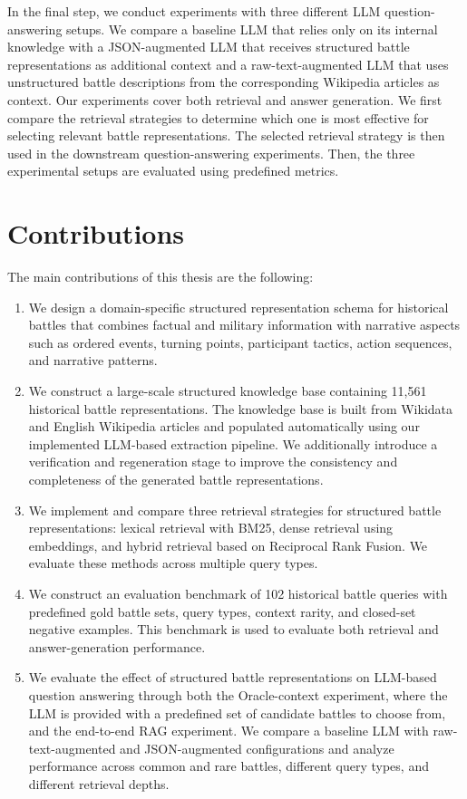 In the final step, we conduct experiments with three different LLM question-answering setups. We compare a baseline LLM that relies only on its internal knowledge with a JSON-augmented LLM that receives structured battle representations as additional context and a raw-text-augmented LLM that uses unstructured battle descriptions from the corresponding Wikipedia articles as context. Our experiments cover both retrieval and answer generation. We first compare the retrieval strategies to determine which one is most effective for selecting relevant battle representations. The selected retrieval strategy is then used in the downstream question-answering experiments. Then, the three experimental setups are evaluated using predefined metrics.
\section{Contributions}
\label{sec:contributions}
The main contributions of this thesis are the following:

\begin{enumerate}
    \item We design a domain-specific structured representation schema for historical battles that combines factual and military information with narrative aspects such as ordered events, turning points, participant tactics, action sequences, and narrative patterns.

    \item We construct a large-scale structured knowledge base containing 11,561 historical battle representations. The knowledge base is built from Wikidata and English Wikipedia articles and populated automatically using our implemented LLM-based extraction pipeline. We additionally introduce a verification and regeneration stage to improve the consistency and completeness of the generated battle representations.

    \item We implement and compare three retrieval strategies for structured battle representations: lexical retrieval with BM25, dense retrieval using embeddings, and hybrid retrieval based on Reciprocal Rank Fusion. We evaluate these methods across multiple query types.

    \item We construct an evaluation benchmark of 102 historical battle queries with predefined gold battle sets, query types, context rarity, and closed-set negative examples. This benchmark is used to evaluate both retrieval and answer-generation performance.

    \item We evaluate the effect of structured battle representations on LLM-based question answering through both the Oracle-context experiment, where the LLM is provided with a predefined set of candidate battles to choose from, and the end-to-end RAG experiment. We compare a baseline LLM with raw-text-augmented and JSON-augmented configurations and analyze performance across common and rare battles, different query types, and different retrieval depths.
\end{enumerate}

